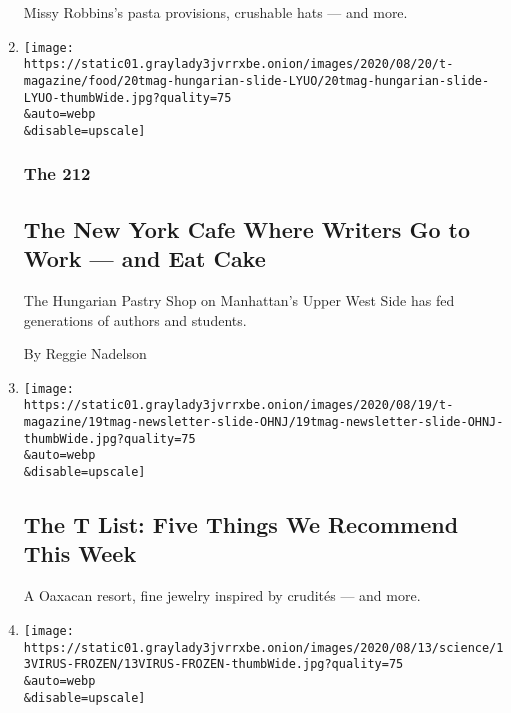 \begin{enumerate}
  Missy Robbins's pasta provisions, crushable hats --- and more.
\item
  \href{/2020/08/21/t-magazine/hungarian-pastry-shop-new-york.html}{}

  \texttt{[image: https://static01.graylady3jvrrxbe.onion/images/2020/08/20/t-magazine/food/20tmag-hungarian-slide-LYUO/20tmag-hungarian-slide-LYUO-thumbWide.jpg?quality=75\\\&auto=webp\\\&disable=upscale]}

  \hypertarget{the-212-2}{%
  \subsubsection{The 212}\label{the-212-2}}

  \hypertarget{the-new-york-cafe-where-writers-go-to-work--and-eat-cake}{%
  \subsection{The New York Cafe Where Writers Go to Work --- and Eat
  Cake}\label{the-new-york-cafe-where-writers-go-to-work--and-eat-cake}}

  The Hungarian Pastry Shop on Manhattan's Upper West Side has fed
  generations of authors and students.

  By Reggie Nadelson
\item
  \href{/2020/08/20/t-magazine/monte-uzulu-vivanterre-emme-parsons.html}{}

  \texttt{[image: https://static01.graylady3jvrrxbe.onion/images/2020/08/19/t-magazine/19tmag-newsletter-slide-OHNJ/19tmag-newsletter-slide-OHNJ-thumbWide.jpg?quality=75\\\&auto=webp\\\&disable=upscale]}

  \hypertarget{the-t-list-five-things-we-recommend-this-week-2}{%
  \subsection{The T List: Five Things We Recommend This
  Week}\label{the-t-list-five-things-we-recommend-this-week-2}}

  A Oaxacan resort, fine jewelry inspired by crudités --- and more.
\item
  \href{/2020/08/13/health/coronavirus-frozen-food.html}{}

  \texttt{[image: https://static01.graylady3jvrrxbe.onion/images/2020/08/13/science/13VIRUS-FROZEN/13VIRUS-FROZEN-thumbWide.jpg?quality=75\\\&auto=webp\\\&disable=upscale]}

  \hypertarget{you-probably-wont-catch-the-coronavirus-from-frozen-food}{%
}
\end{enumerate}

